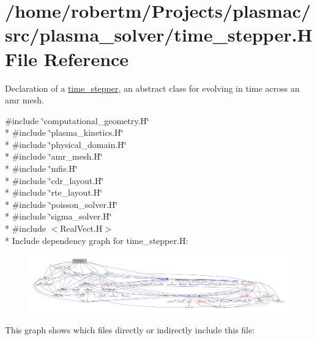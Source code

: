 \hypertarget{time__stepper_8H}{}\section{/home/robertm/\+Projects/plasmac/src/plasma\+\_\+solver/time\+\_\+stepper.H File Reference}
\label{time__stepper_8H}


Declaration of a \hyperlink{classtime__stepper}{time\+\_\+stepper}, an abstract class for evolving in time across an amr mesh.  


{\ttfamily \#include \char`\"{}computational\+\_\+geometry.\+H\char`\"{}}\\*
{\ttfamily \#include \char`\"{}plasma\+\_\+kinetics.\+H\char`\"{}}\\*
{\ttfamily \#include \char`\"{}physical\+\_\+domain.\+H\char`\"{}}\\*
{\ttfamily \#include \char`\"{}amr\+\_\+mesh.\+H\char`\"{}}\\*
{\ttfamily \#include \char`\"{}mfis.\+H\char`\"{}}\\*
{\ttfamily \#include \char`\"{}cdr\+\_\+layout.\+H\char`\"{}}\\*
{\ttfamily \#include \char`\"{}rte\+\_\+layout.\+H\char`\"{}}\\*
{\ttfamily \#include \char`\"{}poisson\+\_\+solver.\+H\char`\"{}}\\*
{\ttfamily \#include \char`\"{}sigma\+\_\+solver.\+H\char`\"{}}\\*
{\ttfamily \#include $<$Real\+Vect.\+H$>$}\\*
Include dependency graph for time\+\_\+stepper.\+H\+:\nopagebreak
\begin{figure}[H]
\begin{center}
\leavevmode
\includegraphics[width=350pt]{time__stepper_8H__incl}
\end{center}
\end{figure}
This graph shows which files directly or indirectly include this file\+:\nopagebreak
